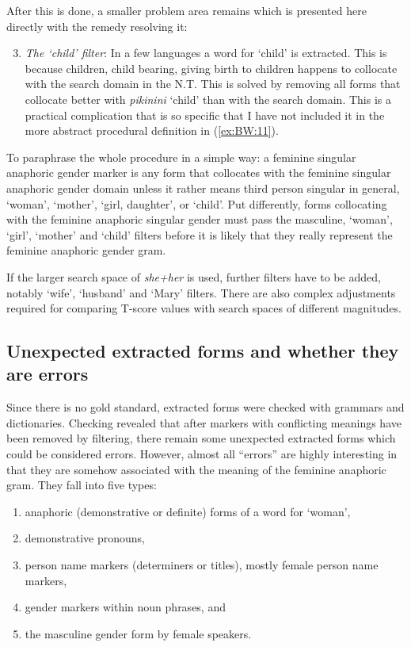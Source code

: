 \documentclass[output=collectionpaper]{langsci/langscibook}
\begin{document}
After this is done, a smaller problem area remains which is presented here directly with the remedy resolving it:

\begin{enumerate}[label=(\roman*)]
\setcounter{enumi}{2}
\item
\emph{The ‘child’ filter}: In a few languages a word for ‘child’ is extracted. This is because children, child bearing, giving birth to children happens to collocate with the search domain in the N.T. This is solved by removing all forms that collocate better with  \textit{pikinini} ‘child’ than with the search domain. This is a practical complication that is so specific that I have not included it in the more abstract procedural definition in (\ref{ex:BW:11}).
\end{enumerate}

To paraphrase the whole procedure in a simple way: a feminine singular anaphoric gender marker is any form that collocates with the feminine singular anaphoric gender domain unless it rather means third person singular in general, ‘woman’, ‘mother’, ‘girl, daughter’, or ‘child’. Put differently, forms collocating with the feminine anaphoric singular gender must pass the masculine, ‘woman’, ‘girl’, ‘mother’ and ‘child’ filters before it is likely that they really represent the feminine anaphoric gender gram.

If the larger search space of  \textit{she+her} is used, further filters have to be added, notably ‘wife’, ‘husband’ and ‘Mary’ filters. There are also complex adjustments required for comparing T-score values with search spaces of different magnitudes.


\subsection{Unexpected extracted forms and whether they are errors}
\label{sec:BW:3.4}

Since there is no gold standard, extracted forms were checked with grammars and dictionaries. Checking revealed that after markers with conflicting meanings have been removed by filtering, there remain some unexpected extracted forms which could be considered errors. However, almost all “errors” are highly interesting in that they are somehow associated with the meaning of the feminine anaphoric gram. They fall into five types:

\begin{enumerate}[label=(\alph*)]
\item anaphoric (demonstrative or definite) forms of a word for ‘woman’,
\item demonstrative pronouns,
\item person name markers (determiners or titles), mostly female person name markers,
\item gender markers within noun phrases, and
\item the masculine gender form by female speakers.
\end{enumerate}
\end{document}
